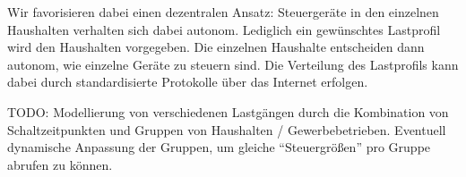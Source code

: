 Wir favorisieren dabei einen dezentralen Ansatz: Steuergeräte in den
einzelnen Haushalten verhalten sich dabei autonom. Lediglich ein
gewünschtes Lastprofil wird den Haushalten vorgegeben. Die einzelnen
Haushalte entscheiden dann autonom, wie einzelne Geräte zu steuern sind.
Die Verteilung des Lastprofils kann dabei durch standardisierte
Protokolle über das Internet erfolgen.

TODO: Modellierung von verschiedenen Lastgängen durch die Kombination
von Schaltzeitpunkten und Gruppen von Haushalten / Gewerbebetrieben.
Eventuell dynamische Anpassung der Gruppen, um gleiche ``Steuergrößen''
pro Gruppe abrufen zu können. 

